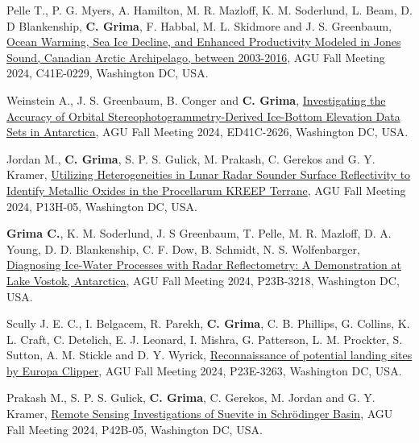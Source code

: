 \begin{etaremune}
\item
    Pelle T., P. G. Myers, A. Hamilton, M. R. Mazloff, K. M. Soderlund, L. Beam, D. D Blankenship, \textbf{C. Grima}, F. Habbal, M. L. Skidmore and J. S. Greenbaum, \href{https://agu.confex.com/agu/agu24/meetingapp.cgi/Paper/1704194}{Ocean Warming, Sea Ice Decline, and Enhanced Productivity Modeled in Jones Sound, Canadian Arctic Archipelago, between 2003-2016}, AGU Fall Meeting 2024, C41E-0229, Washington DC, USA.
    
\item
    Weinstein A., J. S. Greenbaum, B. Conger and \textbf{C. Grima}, \href{https://agu.confex.com/agu/agu24/meetingapp.cgi/Paper/1573661}{Investigating the Accuracy of Orbital Stereophotogrammetry-Derived Ice-Bottom Elevation Data Sets in Antarctica}, AGU Fall Meeting 2024, ED41C-2626, Washington DC, USA.
    
\item
    Jordan M., \textbf{C. Grima}, S. P. S. Gulick, M. Prakash, C. Gerekos and G. Y. Kramer, \href{https://agu.confex.com/agu/agu24/meetingapp.cgi/Paper/1658169}{Utilizing Heterogeneities in Lunar Radar Sounder Surface Reflectivity to Identify Metallic Oxides in the Procellarum KREEP Terrane}, AGU Fall Meeting 2024, P13H-05, Washington DC, USA.
    
\item
    \textbf{Grima C.}, K. M. Soderlund, J. S Greenbaum, T. Pelle, M. R. Mazloff, D. A. Young, D. D. Blankenship, C. F. Dow, B. Schmidt, N. S. Wolfenbarger, \href{https://agu.confex.com/agu/agu24/meetingapp.cgi/Paper/1567915}{Diagnosing Ice-Water Processes with Radar Reflectometry: A Demonstration at Lake Vostok, Antarctica}, AGU Fall Meeting 2024, P23B-3218, Washington DC, USA.
    
\item
    Scully J. E. C., I. Belgacem, R. Parekh, \textbf{C. Grima}, C. B. Phillips, G. Collins, K. L. Craft, C. Detelich, E. J. Leonard, I. Mishra, G. Patterson, L. M. Prockter, S. Sutton, A. M. Stickle and D. Y. Wyrick, \href{https://agu.confex.com/agu/agu24/meetingapp.cgi/Paper/1641784}{Reconnaissance of potential landing sites by Europa Clipper}, AGU Fall Meeting 2024, P23E-3263, Washington DC, USA.
    
\item
    Prakash M., S. P. S. Gulick, \textbf{C. Grima}, C. Gerekos, M. Jordan and G. Y. Kramer, \href{https://agu.confex.com/agu/agu24/meetingapp.cgi/Paper/1611066}{Remote Sensing Investigations of Suevite in Schrödinger Basin}, AGU Fall Meeting 2024, P42B-05, Washington DC, USA.
    

\end{etaremune}
